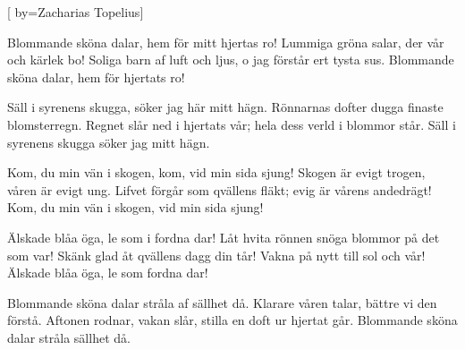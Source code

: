 


[ 	%
	by={Zacharias Topelius}]		%
	
\beginverse*		%
Blommande sköna dalar,
hem för mitt hjertas ro! 
Lummiga gröna salar,
der vår och kärlek bo! 
Soliga barn af luft och ljus, 
o jag förstår ert tysta sus. 
Blommande sköna dalar,
hem för hjertats ro!
\endverse			%

\beginverse*		%
Säll i syrenens skugga,
söker jag här mitt hägn. 
Rönnarnas dofter dugga
finaste blomsterregn. 
Regnet slår ned i hjertats vår; 
hela dess verld i blommor står. 
Säll i syrenens skugga
söker jag mitt hägn.
\endverse			%

\beginverse*		%
Kom, du min vän i skogen,
kom, vid min sida sjung!
Skogen är evigt trogen,
våren är evigt ung.
Lifvet förgår som qvällens fläkt;
evig är vårens andedrägt!
Kom, du min vän i skogen,
vid min sida sjung!
\endverse			%

\beginverse*		%
Älskade blåa öga,
le som i fordna dar!
Låt hvita rönnen snöga
blommor på det som var!
Skänk glad åt qvällens dagg din tår!
Vakna på nytt till sol och vår!
Älskade blåa öga,
le som fordna dar!
\endverse			%

\beginverse*		%
Blommande sköna dalar
stråla af sällhet då.
Klarare våren talar,
bättre vi den förstå.
Aftonen rodnar, vakan slår,
stilla en doft ur hjertat går.
Blommande sköna dalar
stråla sällhet då.
\endverse			%
\endsong			%
